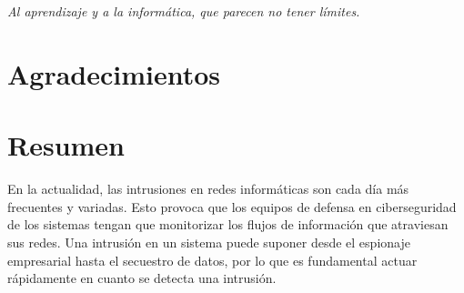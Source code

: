 \documentclass[openright,twoside,10pt]{book}
\begin{document}
\chapter*{}
\begin{flushright}
\textit{%
Al aprendizaje y a la informática, que parecen no tener límites.
}
\end{flushright}

\chapter*{Agradecimientos} %







\chapter*{Resumen} %

En la actualidad, las intrusiones en redes informáticas son cada día más frecuentes y variadas. Esto provoca que los equipos de defensa en ciberseguridad de los sistemas tengan que monitorizar los flujos de información que atraviesan sus redes. Una intrusión en un sistema puede suponer desde el espionaje empresarial hasta el secuestro de datos, por lo que es fundamental actuar rápidamente en cuanto se detecta una intrusión.
\end{document}
